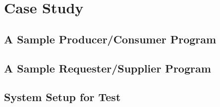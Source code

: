 \chapter{Case Study}\label{chapter:case_study}

\section{A Sample Producer/Consumer Program}
\label{sec:producer-consumer-program}

\section{A Sample Requester/Supplier Program}
\label{sec:request-reply-program}

\section{System Setup for Test}
